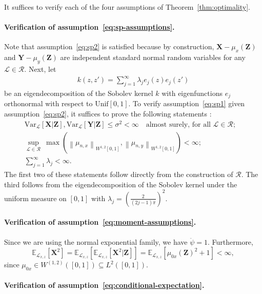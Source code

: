 \documentclass[12pt]{article}
\theoremstyle{definition}
\theoremstyle{remark}
\newcommand{\E}{\mathbb E}								%
\newcommand{\V}{\mathrm{Var}}							%
\newcommand{\norm}[1]{\left\lVert{#1}\right\rVert}		%
\newcommand{\prx}{\bm X}								%
\newcommand{\prz}{\bm Z}								%
\newcommand{\pry}{{\bm Y}}								%
\newcommand{\law}{\mathcal L}							%
\newcommand{\regclass}{\mathscr R}					    %
\begin{document}
It suffices to verify each of the four assumptions of Theorem~\ref{thm:optimality}.

\paragraph{Verification of assumption~\eqref{eq:sp-assumptions}.}

Note that assumption~\eqref{eq:sp2} is satisfied because by construction, $\prx - \mu_{x}(\prz)$ and $\pry - \mu_y(\prz)$ are independent standard normal random variables for any $\law \in \regclass$. Next, let 
\begin{align}\label{eq:eigen_decomp}
	k(z,z')=\sum_{j=1}^{\infty}\lambda_{j}e_{j}(z)e_{j}(z')
\end{align}
be an eigendecomposition of the Sobolev kernel $k$ with eigenfunctions $e_{j}$ orthonormal with respect to $\text{Unif}[0,1]$. To verify assumption~\eqref{eq:sp1} given assumption~\eqref{eq:sp2}, it suffices to prove the following statements \citep[Theorem 11 and Remark 12]{Shah2018}: 
\begin{align*}
\V_{\law}[\prx|\prz], \V_{\law}[\pry|\prz] \leq \sigma^2 < \infty \quad \text{almost surely, for all } \law \in \regclass;& \\
\sup_{\law \in \regclass}\ \max(\norm{\mu_{n,x}}_{W^{1,2}[0,1]}, \norm{\mu_{n,y}}_{W^{1,2}[0,1]}) < \infty;& \\
\sum_{j = 1}^\infty \lambda_{j} < \infty.&
\end{align*}
The first two of these statements follow directly from the construction of $\regclass$. The third follows from the eigendecomposition of the Sobolev kernel under the uniform measure on $[0,1]$ \citep[Example 12.23]{Wainwright2019} with $\lambda_j = (\frac{2}{(2j-1)\pi})^2$.

\paragraph{Verification of assumption~\eqref{eq:moment-assumptions}.}

Since we are using the normal exponential family, we have $\ddot \psi = 1$. Furthermore, 
\begin{equation}
\E_{\law_{x,z}}[\prx^2] = \E_{\law_{x,z}}[\E_{\law_{x,z}}[\prx^2|\prz]] = \E_{\law_{x,z}}[\mu_{0x}(\prz)^2 + 1] < \infty,
\end{equation}
since $\mu_{0x} \in W^{(1,2)}([0,1]) \subseteq L^2([0,1])$.

\paragraph{Verification of assumption~\eqref{eq:conditional-expectation}.}
\end{document}

